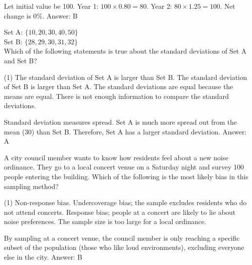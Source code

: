 \documentclass[11pt,paper=a4,answers]{exam}
\begin{document}
\begin{questions}
\begin{solution}
Let initial value be 100.
\vspace{5pt}
Year 1: $100 \times 0.80 = 80$.
\vspace{5pt}
Year 2: $80 \times 1.25 = 100$.
\vspace{5pt}
Net change is $0\%$.
\vspace{5pt}
Answer: \colorbox{yellow!100}{B}
\end{solution}

\vspace{1cm}

\question
Set A: $\{10, 20, 30, 40, 50\}$ \\
Set B: $\{28, 29, 30, 31, 32\}$ \\
Which of the following statements is true about the standard deviations of Set A and Set B?
\begin{tasks}(1)
    \task The standard deviation of Set A is larger than Set B.
    \task The standard deviation of Set B is larger than Set A.
    \task The standard deviations are equal because the means are equal.
    \task There is not enough information to compare the standard deviations.
\end{tasks}

\begin{solution}
Standard deviation measures spread. Set A is much more spread out from the mean (30) than Set B. Therefore, Set A has a larger standard deviation.
\vspace{5pt}
Answer: \colorbox{yellow!100}{A}
\end{solution}

\vspace{1cm}

\question
A city council member wants to know how residents feel about a new noise ordinance. They go to a local concert venue on a Saturday night and survey 100 people entering the building. Which of the following is the most likely bias in this sampling method?
\begin{tasks}(1)
    \task Non-response bias.
    \task Undercoverage bias; the sample excludes residents who do not attend concerts.
    \task Response bias; people at a concert are likely to lie about noise preferences.
    \task The sample size is too large for a local ordinance.
\end{tasks}

\begin{solution}
By sampling at a concert venue, the council member is only reaching a specific subset of the population (those who like loud environments), excluding everyone else in the city.
\vspace{5pt}
Answer: \colorbox{yellow!100}{B}
\end{solution}


\end{questions}
\end{document}
